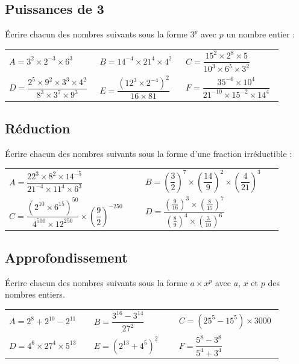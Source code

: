 \documentclass[oneside,12pt]{article}          %
\begin{document}
\subsection{Puissances de 3}
Écrire chacun des nombres suivants sous la forme $3^p$ avec $p$ un nombre entier :

\renewcommand{\arraystretch}{2.5}
\begin{tabular}{p{0.3\linewidth} p{0.3\linewidth} p{0.3\linewidth}}
    $A=3^2\times2^{-3}\times6^3$ & $B=14^{-4}\times21^4\times4^2$ & $C=\dfrac{15^2\times2^8\times5}{10^3\times6^5\times3^2}$ \\
    $D=\dfrac{2^5\times9^2\times3^3\times4^2}{8^3\times3^7\times9^3}$ & $E=\dfrac{\left(12^3\times2^{-4}\right)^2}{16\times81}$ & $F=\dfrac{35^{-6}\times10^4}{21^{-10}\times15^{-2}\times14^4}$
\end{tabular}



\subsection{Réduction}
Écrire chacun des nombres suivants sous la forme d'une fraction irréductible :

\renewcommand{\arraystretch}{3}
\begin{tabular}{p{0.45\linewidth} p{0.45\linewidth}}
    $A=\dfrac{22^3\times8^2\times14^{-5}}{21^{-4}\times11^4\times6^3}$ & $B=\left(\dfrac{3}{2}\right)^7\times\left(\dfrac{14}{9}\right)^2\times\left(\dfrac{4}{21}\right)^3$ \\
    $C=\dfrac{\left(2^{10}\times6^{15}\right)^{50}}{4^{500}\times12^{250}}\times\left(\dfrac{9}{2}\right)^{-250}$ & $D=\dfrac{\left(\frac{9}{16}\right)^3\times\left(\frac{8}{15}\right)^7}{\left(\frac{8}{9}\right)^4\times\left(\frac{3}{10}\right)^6}$
\end{tabular}



\subsection{Approfondissement}
Écrire chacun des nombres suivants sous la forme $a\times x^p$ avec $a$, $x$ et $p$ des nombres entiers.

\renewcommand{\arraystretch}{2}
\begin{tabular}{p{0.3\linewidth} p{0.3\linewidth} p{0.3\linewidth}}
    $A=2^8+2^{10}-2^{11}$ & $B=\dfrac{3^{16}-3^{14}}{27^2}$ & $C=(25^5-15^5)\times3000$ \\
    $D=4^6\times27^4\times5^{13}$ & $E=\left(2^{13}+4^5\right)^2$ & $F=\dfrac{5^8-3^8}{5^4+3^4}$
\end{tabular}
\end{document}
